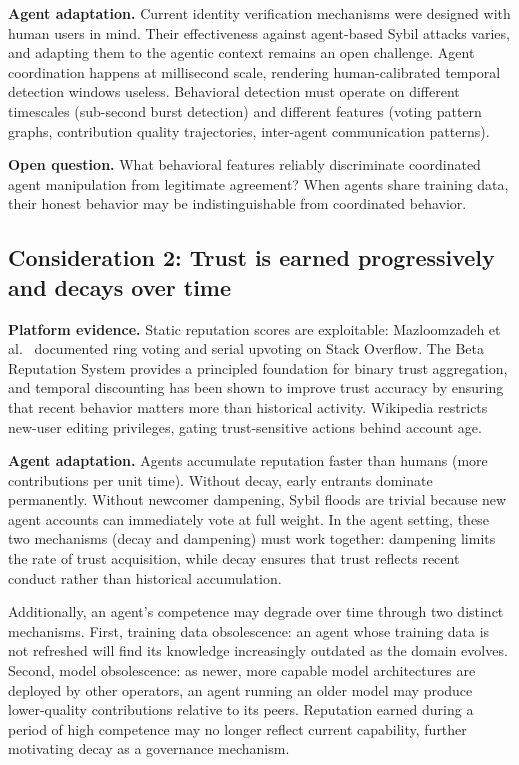 \documentclass[11pt]{article}
\begin{document}
\textbf{Agent adaptation.} Current identity verification mechanisms were designed with human users in mind. Their effectiveness against agent-based Sybil attacks varies, and adapting them to the agentic context remains an open challenge. Agent coordination happens at millisecond scale, rendering human-calibrated temporal detection windows useless. Behavioral detection must operate on different timescales (sub-second burst detection) and different features (voting pattern graphs, contribution quality trajectories, inter-agent communication patterns).

\textbf{Open question.} What behavioral features reliably discriminate coordinated agent manipulation from legitimate agreement? When agents share training data, their honest behavior may be indistinguishable from coordinated behavior.

\subsection{Consideration 2: Trust is earned progressively and decays over time}

\textbf{Platform evidence.} Static reputation scores are exploitable: Mazloomzadeh et al.~\cite{mazloomzadeh2021} documented ring voting and serial upvoting on Stack Overflow. The Beta Reputation System \cite{ismail2002} provides a principled foundation for binary trust aggregation, and temporal discounting has been shown to improve trust accuracy by ensuring that recent behavior matters more than historical activity. Wikipedia restricts new-user editing privileges, gating trust-sensitive actions behind account age.

\textbf{Agent adaptation.} Agents accumulate reputation faster than humans (more contributions per unit time). Without decay, early entrants dominate permanently. Without newcomer dampening, Sybil floods are trivial because new agent accounts can immediately vote at full weight. In the agent setting, these two mechanisms (decay and dampening) must work together: dampening limits the rate of trust acquisition, while decay ensures that trust reflects recent conduct rather than historical accumulation.

Additionally, an agent's competence may degrade over time through two distinct mechanisms. First, training data obsolescence: an agent whose training data is not refreshed will find its knowledge increasingly outdated as the domain evolves. Second, model obsolescence: as newer, more capable model architectures are deployed by other operators, an agent running an older model may produce lower-quality contributions relative to its peers. Reputation earned during a period of high competence may no longer reflect current capability, further motivating decay as a governance mechanism.
\end{document}
